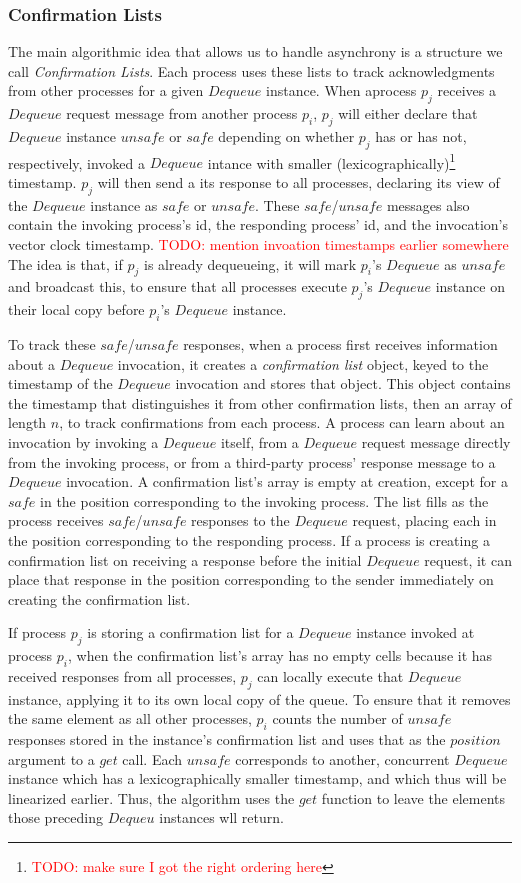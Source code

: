 \documentclass[a4paper,anonymous,USenglish]{lipics-v2021} %
\theoremstyle{definition}
\begin{document}
\subsubsection{Confirmation Lists}
The main algorithmic idea that allows us to handle asynchrony is a structure we call \emph{Confirmation Lists}.  Each process uses these lists to track acknowledgments from other processes for a given $Dequeue$ instance.  When aprocess $p_j$ receives a $Dequeue$ request message from another process $p_i$, $p_j$ will either declare that $Dequeue$ instance $unsafe$ or $safe$ depending on whether $p_j$ has or has not, respectively, invoked a $Dequeue$ intance with smaller (lexicographically)\footnote{\textcolor{red}{TODO: make sure I got the right ordering here}} timestamp.  $p_j$ will then send a its response to all processes, declaring its view of the $Dequeue$ instance as $safe$ or $unsafe$. These $safe$/$unsafe$ messages also contain the invoking process's id, the responding process' id, and the invocation's vector clock timestamp.  \textcolor{red}{TODO: mention invoation timestamps earlier somewhere}  The idea is that, if $p_j$ is already dequeueing, it will mark $p_i$'s $Dequeue$ as $unsafe$ and broadcast this, to ensure that all processes execute $p_j$'s $Dequeue$ instance on their local copy before $p_i$'s $Dequeue$ instance.

To track these $safe$/$unsafe$ responses, when a process first receives information about a $Dequeue$ invocation, it creates a \emph{confirmation list} object, keyed to the timestamp of the $Dequeue$ invocation and stores that object.  This object contains the timestamp that distinguishes it from other confirmation lists, then an array of length $n$, to track confirmations from each process.  A process can learn about an invocation by invoking a $Dequeue$ itself, from a $Dequeue$ request message directly from the invoking process, or from a third-party process' response message to a $Dequeue$ invocation.  A confirmation list's array is empty at creation, except for a $safe$ in the position corresponding to the invoking process.  The list fills as the process receives $safe$/$unsafe$ responses to the $Dequeue$ request, placing each in the position corresponding to the responding process.  If a process is creating a confirmation list on receiving a response before the initial $Dequeue$ request, it can place that response in the position corresponding to the sender immediately on creating the confirmation list.

If process $p_j$ is storing a confirmation list for a $Dequeue$ instance invoked at process $p_i$, when the confirmation list's array has no empty cells because it has received responses from all processes, $p_j$ can locally execute that $Dequeue$ instance, applying it to its own local copy of the queue.  To ensure that it removes the same element as all other processes, $p_i$ counts the number of $unsafe$ responses stored in the instance's confirmation list and uses that as the $position$ argument to a $get$ call.  Each $unsafe$ corresponds to another, concurrent $Dequeue$ instance which has a lexicographically smaller timestamp, and which thus will be linearized earlier.  Thus, the algorithm uses the $get$ function to leave the elements those preceding $Dequeu$ instances wll return.
\end{document}
